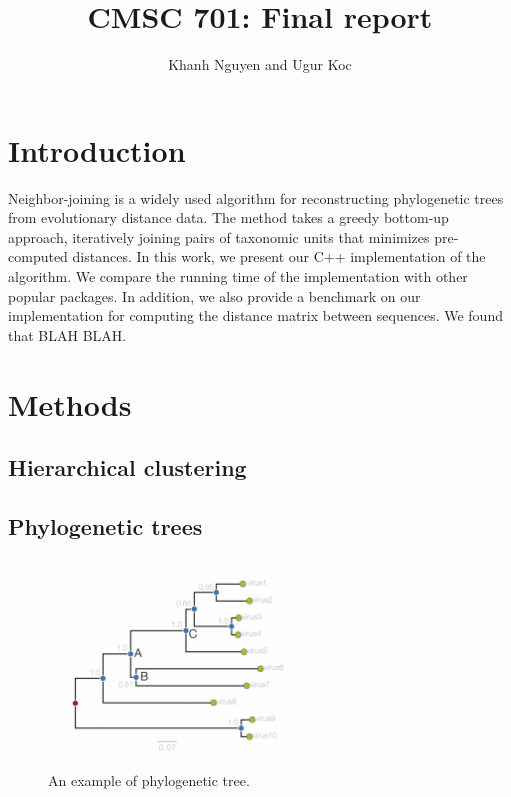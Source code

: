 \documentclass[11pt,letterpaper]{article}
\title{
   CMSC 701: Final report
}
\author{
	Khanh Nguyen and Ugur Koc
}
\theoremstyle{definition}
\begin{document}
\maketitle

\section{Introduction}

Neighbor-joining is a widely used algorithm for reconstructing phylogenetic trees from evolutionary distance data. The method takes a greedy bottom-up approach, iteratively joining pairs of taxonomic units that minimizes pre-computed distances. In this work, we present our C++ implementation of the algorithm. We compare the running time of the implementation with other popular packages. In addition, we also provide a benchmark on our implementation for computing the distance matrix between sequences. We found that BLAH BLAH.

\section{Methods}

\subsection{Hierarchical clustering}

\subsection{Phylogenetic trees}

\begin{figure}[h]
  \centering
  \includegraphics[width=0.6\textwidth]{phylogram_1a.png}
  \caption{An example of phylogenetic tree.}
  \label{fig:phytree}
\end{figure}
\end{document}
